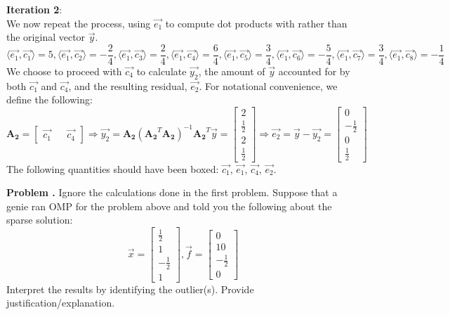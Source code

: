 \documentclass[11pt,letterpaper]{article}
\newcounter{problem}
\newcommand{\problem}{
	\stepcounter{problem}%
	\noindent \textbf{Problem \theproblem. }%
}
\begin{document}
\textbf{Iteration 2}: \\
We now repeat the process, using $\vec{e_{1}}$ to compute dot products with rather than the original vector $\vec{y}$.
\begin{equation*}
    \langle\vec{e_{1}},\vec{c_{1}}\rangle = 5,        \langle\vec{e_{1}},\vec{c_{2}}\rangle = -\frac{2}{4},
    \langle\vec{e_{1}},\vec{c_{3}}\rangle = \frac{2}{4},
    \langle\vec{e_{1}},\vec{c_{4}}\rangle = \frac{6}{4},
    \langle\vec{e_{1}},\vec{c_{5}}\rangle = \frac{3}{4},
    \langle\vec{e_{1}},\vec{c_{6}}\rangle = -\frac{5}{4},
    \langle\vec{e_{1}},\vec{c_{7}}\rangle = \frac{3}{4},
    \langle\vec{e_{1}},\vec{c_{8}}\rangle = -\frac{1}{4}
\end{equation*}
We choose to proceed with $\vec{c_{4}}$ to calculate $\vec{y_{2}}$, the amount of $\vec{y}$ accounted for by both $\vec{c_{1}}$ and $\vec{c_{4}}$, and the resulting residual, $\vec{e_{2}}$. For notational convenience, we define the following:
\begin{equation*}
    \boldsymbol{A_{2}} = \begin{bmatrix}
        \vec{c_{1}} && \vec{c_{4}}
    \end{bmatrix} \Rightarrow
    \vec{y_{2}} = \boldsymbol{A_{2}}(\boldsymbol{A_{2}}^T\boldsymbol{A_{2}})^{-1}\boldsymbol{A_{2}}^T\vec{y} = \begin{bmatrix}
        2 \\ \frac{1}{2} \\ 2 \\ \frac{1}{2}
    \end{bmatrix} \Rightarrow
    \vec{e_{2}} = \vec{y} - \vec{y_{2}} = \begin{bmatrix}
        0 \\ -\frac{1}{2} \\ 0 \\ \frac{1}{2}
    \end{bmatrix}
\end{equation*}
The following quantities should have been boxed: $\vec{c_{1}}$, $\vec{e_{1}}$, $\vec{c_{4}}$, $\vec{e_{2}}$.

\newpage
\problem Ignore the calculations done in the first problem. Suppose that a genie ran OMP for the problem above and told you the following about the sparse solution: %
\begin{equation*}
    \vec{x} = \begin{bmatrix}
        \frac{1}{2} \\ 1 \\ -\frac{1}{2} \\ 1
    \end{bmatrix}, \vec{f} = \begin{bmatrix}
        0 \\ 10 \\ -\frac{1}{2} \\ 0
    \end{bmatrix}
\end{equation*}
Interpret the results by identifying the outlier(s). Provide justification/explanation. \\
\end{document}
